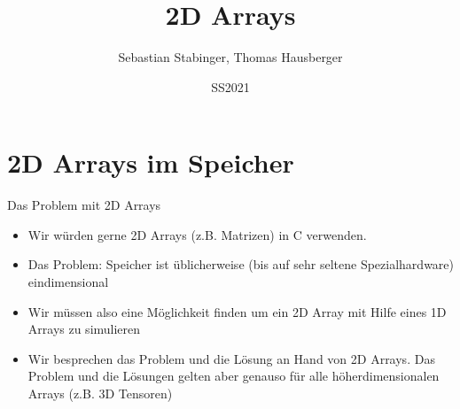 \documentclass[presentation]{beamer}
\author{Sebastian Stabinger, Thomas Hausberger}
\date{SS2021}
\title{2D Arrays}
\begin{document}
\maketitle
\section{2D Arrays im Speicher}
\label{sec:org086c82d}
\begin{frame}[label={sec:org3de9423}]{Das Problem mit 2D Arrays}
\begin{itemize}
\item Wir würden gerne 2D Arrays (z.B. Matrizen) in C verwenden.
\item Das Problem: \alert{Speicher ist} üblicherweise (bis auf sehr seltene
Spezialhardware) \alert{eindimensional}
\item Wir müssen also eine Möglichkeit finden um ein \alert{2D Array mit Hilfe
eines 1D Arrays zu simulieren}
\item Wir besprechen das Problem und die Lösung an Hand von 2D Arrays. Das
Problem und die Lösungen \alert{gelten aber genauso für alle
höherdimensionalen} Arrays (z.B. 3D Tensoren)
\end{itemize}
\end{frame}
\end{document}
